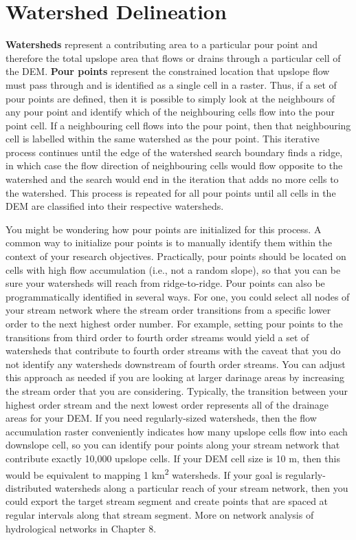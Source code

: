 \documentclass[
]{book}
\begin{document}
\hypertarget{watershed-delineation}{%
\section{Watershed Delineation}\label{watershed-delineation}}

\textbf{Watersheds} represent a contributing area to a particular pour point and therefore the total upslope area that flows or drains through a particular cell of the DEM. \textbf{Pour points} represent the constrained location that upslope flow must pass through and is identified as a single cell in a raster. Thus, if a set of pour points are defined, then it is possible to simply look at the neighbours of any pour point and identify which of the neighbouring cells flow into the pour point cell. If a neighbouring cell flows into the pour point, then that neighbouring cell is labelled within the same watershed as the pour point. This iterative process continues until the edge of the watershed search boundary finds a ridge, in which case the flow direction of neighbouring cells would flow opposite to the watershed and the search would end in the iteration that adds no more cells to the watershed. This process is repeated for all pour points until all cells in the DEM are classified into their respective watersheds.

You might be wondering how pour points are initialized for this process. A common way to initialize pour points is to manually identify them within the context of your research objectives. Practically, pour points should be located on cells with high flow accumulation (i.e., not a random slope), so that you can be sure your watersheds will reach from ridge-to-ridge. Pour points can also be programmatically identified in several ways. For one, you could select all nodes of your stream network where the stream order transitions from a specific lower order to the next highest order number. For example, setting pour points to the transitions from third order to fourth order streams would yield a set of watersheds that contribute to fourth order streams with the caveat that you do not identify any watersheds downstream of fourth order streams. You can adjust this approach as needed if you are looking at larger darinage areas by increasing the stream order that you are considering. Typically, the transition between your highest order stream and the next lowest order represents all of the drainage areas for your DEM. If you need regularly-sized watersheds, then the flow accumulation raster conveniently indicates how many upslope cells flow into each downslope cell, so you can identify pour points along your stream network that contribute exactly 10,000 upslope cells. If your DEM cell size is 10 m, then this would be equivalent to mapping 1 km\textsuperscript{2} watersheds. If your goal is regularly-distributed watersheds along a particular reach of your stream network, then you could export the target stream segment and create points that are spaced at regular intervals along that stream segment. More on network analysis of hydrological networks in Chapter 8.
\end{document}
